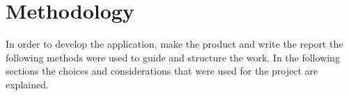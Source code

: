 \section{Methodology}
In order to develop the application, make the product and write the report the following methods were used to guide and structure the work. In the following sections the choices and considerations that were used for the project are explained. 




